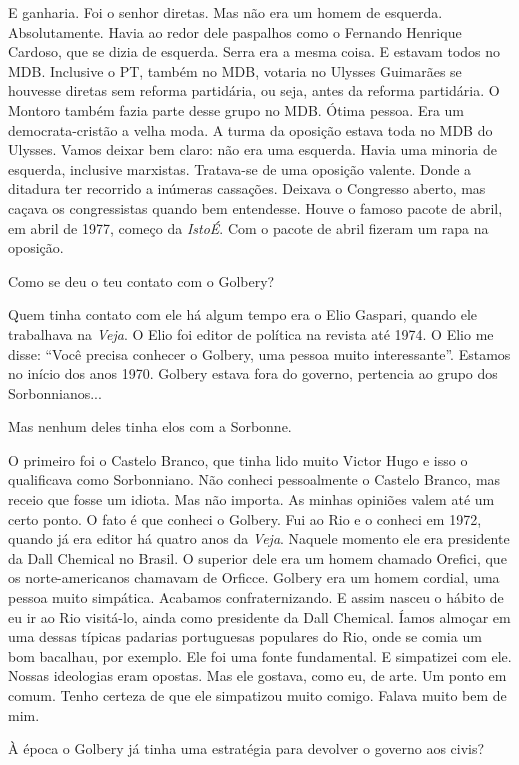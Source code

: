 \falaM E ganharia. Foi o senhor diretas. Mas não era um homem de esquerda.
Absolutamente. Havia ao redor dele paspalhos como o Fernando Henrique
Cardoso, que se dizia de esquerda. Serra era a mesma coisa. E estavam
todos no MDB. Inclusive o PT, também no MDB, votaria no Ulysses
Guimarães se houvesse diretas sem reforma partidária, ou seja, antes da
reforma partidária. O Montoro também fazia parte desse grupo no MDB.
Ótima pessoa. Era um democrata-cristão a velha moda. A turma da oposição
estava toda no MDB do Ulysses. Vamos deixar bem claro: não era uma
esquerda. Havia uma minoria de esquerda, inclusive marxistas. Tratava-se
de uma oposição valente. Donde a ditadura ter recorrido a inúmeras
cassações. Deixava o Congresso aberto, mas caçava os congressistas
quando bem entendesse. Houve o famoso pacote de abril, em abril de 1977,
começo da \emph{IstoÉ}. Com o pacote de abril fizeram um rapa na
oposição.

\falaG Como se deu o teu contato com o Golbery?

\falaM Quem tinha contato com ele há algum tempo era o Elio Gaspari, quando
ele trabalhava na \emph{Veja}. O Elio foi editor de política na revista
até 1974. O Elio me disse: ``Você precisa conhecer o Golbery, uma pessoa
muito interessante''. Estamos no início dos anos 1970. Golbery estava
fora do governo, pertencia ao grupo dos Sorbonnianos...

\falaG Mas nenhum deles tinha elos com a Sorbonne.

\falaM O primeiro foi o Castelo Branco, que tinha lido muito Victor Hugo e
isso o qualificava como Sorbonniano. Não conheci pessoalmente o Castelo
Branco, mas receio que fosse um idiota. Mas não importa. As minhas
opiniões valem até um certo ponto. O fato é que conheci o Golbery. Fui
ao Rio e o conheci em 1972, quando já era editor há quatro anos da
\emph{Veja}. Naquele momento ele era presidente da Dall Chemical no
Brasil. O superior dele era um homem chamado Orefici, que os
norte-americanos chamavam de Orficce. Golbery era um homem cordial, uma
pessoa muito simpática. Acabamos confraternizando. E assim nasceu o
hábito de eu ir ao Rio visitá-lo, ainda como presidente da Dall
Chemical. Íamos almoçar em uma dessas típicas padarias portuguesas
populares do Rio, onde se comia um bom bacalhau, por exemplo. Ele foi
uma fonte fundamental. E simpatizei com ele. Nossas ideologias eram
opostas. Mas ele gostava, como eu, de arte. Um ponto em comum. Tenho
certeza de que ele simpatizou muito comigo. Falava muito bem de mim.

\falaG À época o Golbery já tinha uma estratégia para devolver o governo aos
civis?

